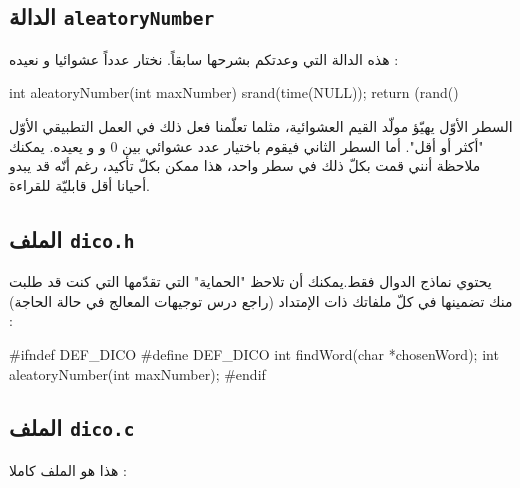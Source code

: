 \subsection{الدالة
\texttt{aleatoryNumber}}
هذه الدالة التي وعدتكم بشرحها سابقاً. نختار عدداً عشوائيا و نعيده :

\begin{Csource}
int aleatoryNumber(int maxNumber)
{
    srand(time(NULL));
    return (rand() %
}
\end{Csource}

السطر الأوّل يهيّؤ مولّد القيم العشوائية، مثلما تعلّمنا فعل ذلك في العمل التطبيقي الأوّل "أكثر أو أقل". أما السطر الثاني فيقوم باختيار عدد عشوائي بين 0
و
و يعيده. يمكنك ملاحظة أنني قمت بكلّ ذلك في سطر واحد، هذا ممكن بكلّ تأكيد، رغم أنّه قد يبدو أحيانا أقل قابليّة للقراءة.

\subsection{الملف
\texttt{dico.h}}
يحتوي نماذج الدوال فقط.يمكنك أن تلاحظ "الحماية" التي تقدّمها
التي كنت قد طلبت منك تضمينها في كلّ ملفاتك ذات الإمتداد
(راجع درس توجيهات المعالج في حالة الحاجة) :

\begin{Csource}
#ifndef DEF_DICO
#define DEF_DICO
int findWord(char *chosenWord);
int aleatoryNumber(int maxNumber);
#endif
\end{Csource}

\subsection{الملف
\texttt{dico.c}}
هذا هو الملف
كاملا :

